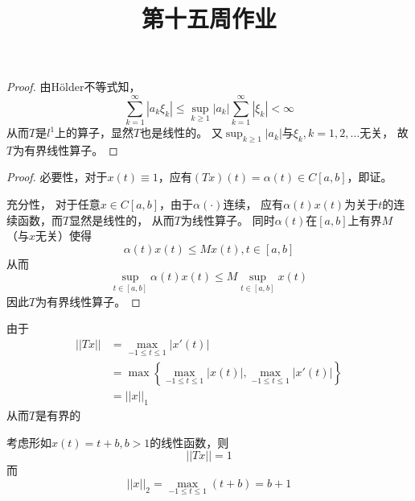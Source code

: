 \documentclass[cn]{homework}
\title{第十五周作业}
\begin{document}
    \maketitle

    \problem
    \begin{proof}
        由H\"older不等式知，
        \[\sum_{k=1}^\infty |a_k\xi_k|
        \leq\sup_{k\geq 1}|a_k|\sum_{k=1}^\infty|\xi_k|<\infty\]
        从而$T$是$l^1$上的算子，显然$T$也是线性的。
        又$\sup_{k\geq 1}|a_k|$与$\xi_k,k=1,2,\ldots$无关，
        故$T$为有界线性算子。

    \end{proof}

    \problem
    \begin{proof}
        必要性，对于$x(t)\equiv 1$，应有$(Tx)(t)=\alpha(t)\in C[a,b]$，即证。
        
        充分性，
        对于任意$x\in C[a,b]$，由于$\alpha(\cdot)$连续，
        应有$\alpha(t)x(t)$为关于$t$的连续函数，而$T$显然是线性的，
        从而$T$为线性算子。
        同时$\alpha(t)$在$[a,b]$上有界$M$（与$x$无关）使得
        \[\alpha(t)x(t)\leq Mx(t),t\in[a,b]\]
        从而
        \[\sup_{t\in[a,b]}\alpha(t)x(t)\leq M\sup_{t\in[a,b]}x(t)\]
        因此$T$为有界线性算子。
    \end{proof}

    \problem
    \begin{subproblem}[(\arabic*)]
        \item
        由于
        \[\begin{aligned}
            ||Tx||&=\max_{-1\leq t\leq 1}|x'(t)|\\
            &=\max\left\{\max_{-1\leq t\leq 1}|x(t)|,\max_{-1\leq t\leq 1}|x'(t)|\right\}\\
            &=||x||_1
        \end{aligned}\]
        从而$T$是有界的
        
        \item
        考虑形如$x(t)=t+b,b>1$的线性函数，则
        \[||Tx||=1\]
        而
        \[||x||_2=\max_{-1\leq t\leq 1}(t+b)=b+1\]
    \end{subproblem}
\end{document}
